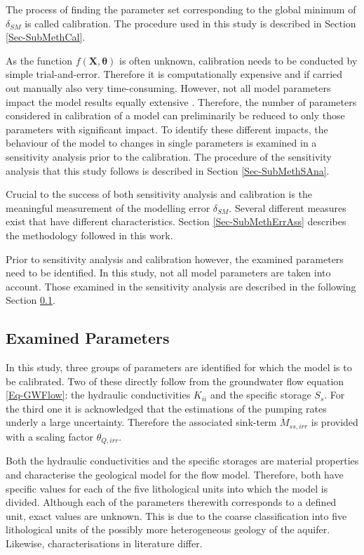 The process of finding the parameter set corresponding to the global minimum of $\delta_{SM}$ is called calibration. The procedure used in this study is described in Section \ref{Sec-SubMethCal}. 

As the function $f(\bm{X},\bm{\theta})$ is often unknown, calibration needs to be conducted by simple trial-and-error. Therefore it is computationally expensive and if carried out manually also very time-consuming. However, not all model parameters impact the model results equally extensive \parencite{Duan.1993}. Therefore, the number of parameters considered in calibration of a model can preliminarily be reduced to only those parameters with significant impact. To identify these different impacts, the behaviour of the model to changes in single parameters is examined in a sensitivity analysis prior to the calibration. The procedure of the sensitivity analysis that this study follows is described in Section \ref{Sec-SubMethSAna}. 

Crucial to the success of both sensitivity analysis and calibration is the meaningful measurement of the modelling error $\delta_{SM}$. Several different measures exist that have different characteristics. Section \ref{Sec-SubMethErrAss} describes the methodology followed in this work.

Prior to sensitivity analysis and calibration however, the examined parameters need to be identified. In this study, not all model parameters are taken into account. Those examined in the sensitivity analysis are described in the following Section \ref{Sec-SubMethParams}.


\subsection{Examined Parameters}
\label{Sec-SubMethParams}

In this study, three groups of parameters are identified for which the model is to be calibrated. Two of these directly follow from the groundwater flow equation \eqref{Eq-GWFlow}: the hydraulic conductivities $K_{ii}$ and the specific storage $S_s$. For the third one it is acknowledged that the estimations of the pumping rates underly a large uncertainty. Therefore the associated sink-term $\dot{M}_{ss,irr}$ is provided with a scaling factor $\theta_{Q,irr}$.

Both the hydraulic conductivities and the specific storages are material properties and characterise the geological model for the flow model. Therefore, both have specific values for each of the five lithological units into which the model is divided. Although each of the parameters therewith corresponds to a defined unit, exact values are unknown. This is due to the coarse classification into five lithological units of the possibly more heterogeneous geology of the aquifer. Likewise, characterisations in literature differ.

